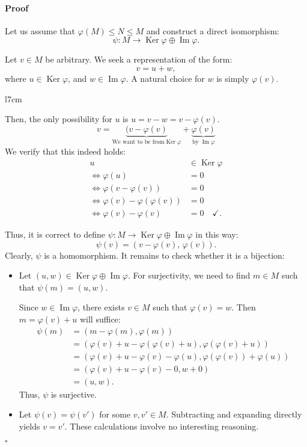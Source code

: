 \documentclass{article}
\newif\ifusemulticols
\newif\ifmobileview
\theoremstyle{definition}
\theoremstyle{remark}
\theoremstyle{plain}
\theoremstyle{plain}
\newenvironment{mymulticols}
    { \ifusemulticols \begin{multicols}{2} \fi }
    { \ifusemulticols \end{multicols} \fi }
\newcommand\mywrapbegin[3]{\ifmobileview\else\begin{wrapfigure}[#1]{#2}{#3}\fi}
\newcommand\mywrapend{\ifmobileview\else\end{wrapfigure}\fi}
\newenvironment{myproof}{\paragraph{Proof}}{\hfill$\square$}
\DeclareMathOperator{\Ker}{Ker}
\DeclareMathOperator{\image}{Im}
\begin{document}
\begin{mymulticols}
\begin{myproof}
    Let us assume that $\varphi(M) \le N \le M$ and construct a direct isomorphism: $$\psi : M \to \Ker \varphi \oplus \image \varphi.$$

    Let $v \in M$ be arbitrary. 
    We seek a representation of the form: $$v = u + w,$$ where $u \in \Ker \varphi$, and $w \in \image \varphi$.
    A natural choice for $w$ is simply $\varphi(v)$.

    \mywrapbegin{10}{l}{7cm}
    \mywrapend

    Then, the only possibility for $u$ is $u = v - w = v - \varphi(v)$. 
    $$v =
        \underbrace{(v-\varphi(v)}_{\text{We want to be from}\Ker\varphi}
        + \underbrace{\varphi(v)}_{\text{by }\image\varphi}
    $$
    We verify that this indeed holds:
    \vspace{-10pt}
    \begin{align*}
        u &\in \Ker \varphi \\
        \Leftrightarrow \varphi(u) &= 0 \\
        \Leftrightarrow \varphi(v - \varphi(v)) &= 0 \\
        \Leftrightarrow \varphi(v) - \varphi(\varphi(v)) &= 0 \\
        \Leftrightarrow \varphi(v) - \varphi(v) &= 0 \quad \checkmark.
    \end{align*}

    Thus, it is correct to define $\psi: M \to {\Ker \varphi \oplus \image \varphi}$ in this way:
    $$\psi(v) = \left(v-\varphi(v),\,\varphi(v)\right).$$
    Clearly, $\psi$ is a homomorphism. It remains to check whether it is a bijection:
    \begin{itemize}
        \item Let $(u, w) \in \Ker \varphi \oplus \image \varphi$. 
            For surjectivity, we need to find $m \in M$ such that $\psi(m) = (u, w)$.

            Since $w \in \image \varphi$, there exists $v \in M$ such that $\varphi(v) = w$.
            Then $m = \varphi(v) + u$ will suffice:
            \begin{align*}
                \psi(m) &= (m - \varphi(m), \varphi(m)) \\
                        &= (\varphi(v) + u - \varphi(\varphi(v) + u),
                            \varphi(\varphi(v) + u)) \\
                        &= (\varphi(v) + u - \varphi(v) - \varphi(u),
                            \varphi(\varphi(v)) + \varphi(u)) \\
                        &= (\varphi(v) + u - \varphi(v) - 0, w + 0) \\
                        &= (u, w).
            \end{align*}
            Thus, $\psi$ is surjective.
        \item Let $\psi(v) = \psi(v')$ for some $v, v' \in M$. Subtracting and expanding directly yields $v = v'$. These calculations involve no interesting reasoning.
    \end{itemize}


\end{myproof}
\end{mymulticols}
\end{document}
